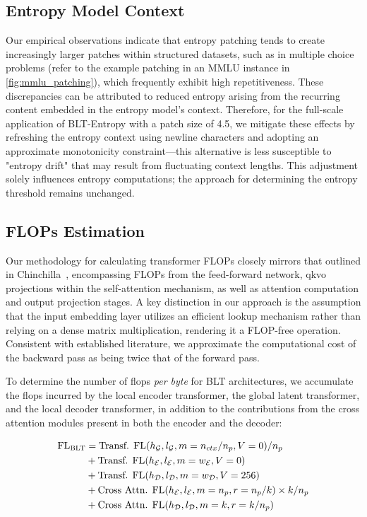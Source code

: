 \subsection{Entropy Model Context}
\label{section:entropy-context}
Our empirical observations indicate that entropy patching tends to create increasingly larger patches within structured datasets, such as in multiple choice problems (refer to the example patching in an MMLU instance in \autoref{fig:mmlu_patching}), which frequently exhibit high repetitiveness. These discrepancies can be attributed to reduced entropy arising from the recurring content embedded in the entropy model's context. Therefore, for the full-scale application of {\textsc BLT}-Entropy with a patch size of 4.5, we mitigate these effects by refreshing the entropy context using newline characters and adopting an approximate monotonicity constraint—this alternative is less susceptible to "entropy drift" that may result from fluctuating context lengths. This adjustment solely influences entropy computations; the approach for determining the entropy threshold remains unchanged.

\subsection{FLOPs Estimation} 
\label{section:flops}

Our methodology for calculating transformer FLOPs closely mirrors that outlined in Chinchilla~\citep{hoffmann2022training}, encompassing FLOPs from the feed-forward network, qkvo projections within the self-attention mechanism, as well as attention computation and output projection stages. A key distinction in our approach is the assumption that the input embedding layer utilizes an efficient lookup mechanism rather than relying on a dense matrix multiplication, rendering it a FLOP-free operation. Consistent with established literature, we approximate the computational cost of the backward pass as being twice that of the forward pass.

To determine the number of flops \textit{per byte} for {\textsc BLT} architectures, we accumulate the flops incurred by the local encoder transformer, the global latent transformer, and the local decoder transformer, in addition to the contributions from the cross attention modules present in both the encoder and the decoder:

\begin{align}
    \text{FL}_{\text{{\textsc BLT}}} &= \text{Transf. FL}(h_{\mathcal{G}}, l_{\mathcal{G}}, m=n_{ctx}/n_p, V=0) / n_p\\
   &+\text{Transf. FL}(h_{\mathcal{E}}, l_{\mathcal{E}}, m=w_{\mathcal{E}}, V=0) \\
   &+ \text{Transf. FL}(h_{\mathcal{D}}, l_{\mathcal{D}}, m=w_{\mathcal{D}}, V=256) \\ 
    &+ \text{Cross Attn. FL}(h_{\mathcal{E}}, l_{\mathcal{E}}, m=n_p, r=n_p/k) \times k/n_p \\ 
   &+ \text{Cross Attn. FL}(h_{\mathcal{D}}, l_{\mathcal{D}}, m=k, r=k/n_p) 
\end{align}

